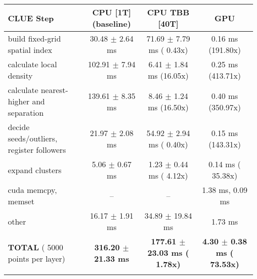     \begin{tabular}{l|c|c|c}
    \hline
    CLUE Step                                 & CPU [1T] (baseline)         & CPU TBB [40T]                         & GPU                       \\ \hline
    build fixed-grid spatial index            &  30.48 $\pm$  2.64 ms       &  71.69 $\pm$  7.79 ms ( 0.43x)        &   0.16 ms (191.80x)       \\
    calculate local density                   & 102.91 $\pm$  7.94 ms       &   6.41 $\pm$  1.84 ms (16.05x)        &   0.25 ms (413.71x)       \\
    calculate nearest-higher and separation   & 139.61 $\pm$  8.35 ms       &   8.46 $\pm$  1.24 ms (16.50x)        &   0.40 ms (350.97x)       \\
    decide seeds/outliers, register followers &  21.97 $\pm$  2.08 ms       &  54.92 $\pm$  2.94 ms ( 0.40x)        &   0.15 ms (143.31x)       \\
    expand clusters                           &   5.06 $\pm$  0.67 ms       &   1.23 $\pm$  0.44 ms ( 4.12x)        &   0.14 ms ( 35.38x)       \\ \hline
    cuda memcpy, memset                       & --                          & --                                    &   1.38 ms,   0.09 ms      \\ 
    other                                     &  16.17 $\pm$  1.91 ms       &  34.89 $\pm$ 19.84 ms                 &   1.73 ms                 \\ \hline
    \textbf{TOTAL} ( 5000 points per layer)   & \textbf{316.20 $\pm$ 21.33 ms} & \textbf{177.61 $\pm$ 23.03 ms ( 1.78x)} & \textbf{  4.30 $\pm$  0.38 ms ( 73.53x)}  \\
    \hline
    \multicolumn{4}{c}{} 
    \end{tabular}
    \linebreak


